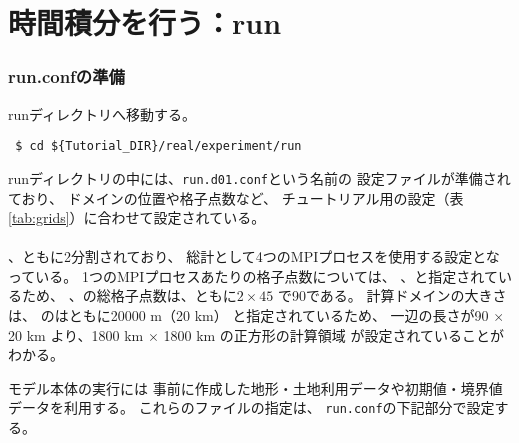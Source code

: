 \section{時間積分を行う：run} \label{sec:tutrial_real_run}
\subsubsection{run.confの準備}
runディレクトリへ移動する。
\begin{verbatim}
 $ cd ${Tutorial_DIR}/real/experiment/run
\end{verbatim}
%
runディレクトリの中には、\verb|run.d01.conf|という名前の
設定ファイルが準備されており、
ドメインの位置や格子点数など、
チュートリアル用の設定（表\ref{tab:grids}）に合わせて設定されている。\\

\\


{\XDIR} 、{\YDIR}ともに2分割されており、
総計として4つのMPIプロセスを使用する設定となっている。
1つのMPIプロセスあたりの格子点数については、
、と指定されているため、
{\XDIR} 、{\YDIR}の総格子点数は、ともに$2 \times 45$ で90である。
計算ドメインの大きさは、
のはともに20000 m（20 km）
と指定されているため、
一辺の長さが90 $\times$ 20 km より、1800 km $\times$ 1800 km の正方形の計算領域
が設定されていることがわかる。


モデル本体の実行には
事前に作成した地形・土地利用データや初期値・境界値データを利用する。
これらのファイルの指定は、
\verb|run.conf|の下記部分で設定する。\\


